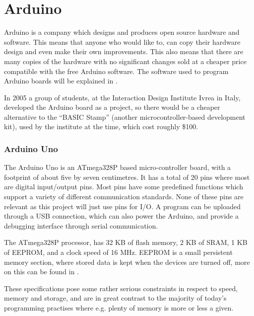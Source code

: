 
\section{Arduino}\label{sec:arduino}
Arduino is a company which designs and produces open source hardware and software.
This means that anyone who would like to, can copy their hardware design and even make their own improvements.
This also means that there are many copies of the hardware with no significant changes sold at a cheaper price compatible with the free Arduino software.
The software used to program Arduino boards will be explained in .

\begin{tcolorbox}[floatplacement=b,float,colback=white!5,colframe=aaublue!50,title=The Birth of the Arduino \cite{birthofarduino}.]
In 2005 a group of students, at the Interaction Design Institute Ivrea in Italy, developed the Arduino board as a project, so there would be a cheaper alternative to the ``BASIC Stamp'' (another microcontroller-based development kit), used by the institute at the time, which cost roughly \$100.
\end{tcolorbox}

\subsubsection{Arduino Uno}
The Arduino Uno is an ATmega328P based micro-controller board, with a footprint of about five by seven centimetres.
It has a total of 20 pins where most are digital input/output pins.
Most pins have some predefined functions which support a variety of different communication standards. 
None of these pins are relevant as this project will just use pins for I/O. 
A program can be uploaded through a USB connection, which can also power the Arduino, and provide a debugging interface through serial communication.

The ATmega328P processor, has 32 KB of flash memory, 2 KB of SRAM, 1 KB of EEPROM, and a clock speed of 16 MHz.
EEPROM is a small persistent memory section, where stored data is kept when the devices are turned off, more on this can be found in \cite{EEPROM}.

These specifications pose some rather serious constraints in respect to speed, memory and storage, and are in great contrast to the majority of today's programming practises where e.g. plenty of memory is more or less a given.